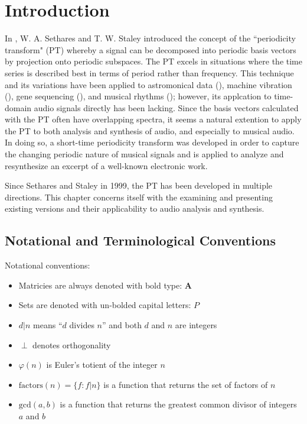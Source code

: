 \chapter{Introduction}

In \cite{sethares1999periodicity}, W. A. Sethares and T. W. Staley introduced the concept of the ``periodicity transform" (PT) whereby a signal can be decomposed into periodic basis vectors by projection onto periodic subspaces. The PT excels in situations where the time series is described best in terms of period rather than frequency. This technique and its variations have been applied to astromonical data (\cite{buccheri1985time}), machine vibration (\cite{muresan2003orthogonal}), gene sequencing (\cite{arora2007detection}), and musical rhythms (\cite{sethares2001meter}); however, its applcation to time-domain audio signals directly has been lacking. Since the basis vectors calculated with the PT often have overlapping spectra, it seems a natural extention to apply the PT to both analysis and synthesis of audio, and especially to musical audio. In doing so, a short-time periodicity transform was developed in order to capture the changing periodic nature of musical signals and is applied to analyze and resynthesize an excerpt of a well-known electronic work.


Since Sethares and Staley in 1999, the PT has been developed in multiple directions. This chapter concerns itself with the examining and presenting existing versions and their applicability to audio analysis and synthesis.

\section{Notational and Terminological Conventions}
Notational conventions:

\begin{addmargin}[4em]{2em}%
\begin{itemize}
    \renewcommand\labelitemi{--}
    \item Matricies are always denoted with bold type: $\bm{A}$
    \item Sets are denoted with un-bolded capital letters: $P$
    \item $d|n$ means ``$d$ divides $n$'' and both $d$ and $n$ are integers
    \item $\perp$ denotes orthogonality
    \item $\varphi(n)$ is Euler's totient of the integer $n$
    \item $\text{factors}(n) = \{f : f|n\}$ is a function that returns the set of factors of $n$
    \item $\text{gcd}(a, b)$ is a function that returns the greatest common divisor of integers $a$ and $b$
\end{itemize}
\end{addmargin}

